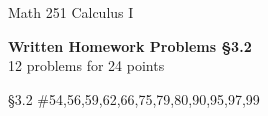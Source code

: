 \documentclass[11pt]{report}
\theoremstyle{plain}
\begin{document}
\hfill Math 251 Calculus I
\begin{center}
\Large{\textbf{Written Homework Problems \S 3.2}} \\
12 problems for 24 points\\
\end{center}

\begin{description}
\item{\S 3.2} \#54,56,59,62,66,75,79,80,90,95,97,99

\end{description}
\end{document}
